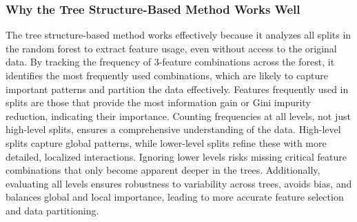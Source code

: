 \documentclass[fleqn,moreauthors,10pt]{ds_report}
\begin{document}
\subsubsection*{Why the Tree Structure-Based Method Works Well}

The tree structure-based method works effectively because it analyzes all splits in the random forest to extract feature usage, even without access to the original data. By tracking the frequency of 3-feature combinations across the forest, it identifies the most frequently used combinations, which are likely to capture important patterns and partition the data effectively. Features frequently used in splits are those that provide the most information gain or Gini impurity reduction, indicating their importance. Counting frequencies at all levels, not just high-level splits, ensures a comprehensive understanding of the data. High-level splits capture global patterns, while lower-level splits refine these with more detailed, localized interactions. Ignoring lower levels risks missing critical feature combinations that only become apparent deeper in the trees. Additionally, evaluating all levels ensures robustness to variability across trees, avoids bias, and balances global and local importance, leading to more accurate feature selection and data partitioning.













\end{document}
